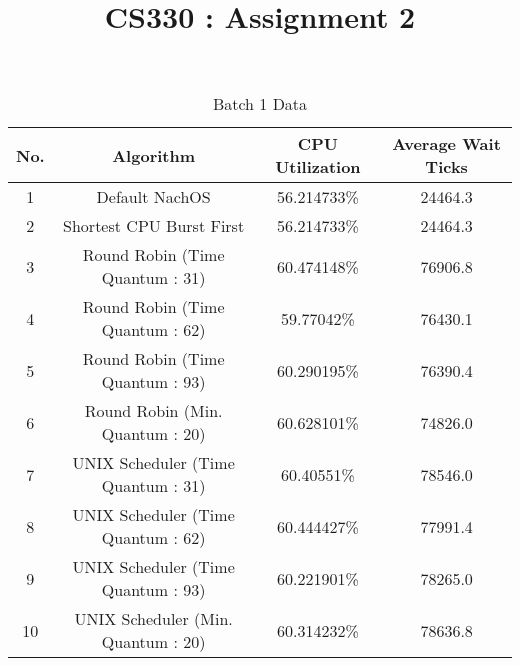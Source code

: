 \documentclass{article}
\author{}
\title{CS330 : Assignment 2}
\begin{document}
\maketitle
\section*{}
	\def\arraystretch{1.5}
	\begin{table}[!htb]
		
			\caption{Batch 1 Data}
		\begin{tabular}{ |c|c|c|c| }
			\hline
			\textbf{No.} & \textbf{Algorithm} & \textbf{CPU Utilization} & \textbf{Average Wait Ticks} \\ \hline
			1     &       Default NachOS  &                               56.214733\%			&       24464.3  \\      \hline
			2       &       Shortest        CPU     Burst   First   &               56.214733\%     &       24464.3  \\      \hline 
			3       &       Round   Robin   (Time   Quantum :       31)&    60.474148\%     &       76906.8  \\      \hline
			4       &       Round   Robin   (Time   Quantum :       62)&    59.77042\%      &       76430.1  \\      \hline
			5       &       Round   Robin   (Time   Quantum :       93)&    60.290195\%     &       76390.4  \\      \hline
			6       &       Round   Robin   (Min.   Quantum :       20)&    60.628101\%     &       74826.0  \\      \hline
			7       &       UNIX    Scheduler       (Time   Quantum :       31)&    60.40551\%      &       78546.0  \\      \hline 
			8       &       UNIX    Scheduler       (Time   Quantum :       62)&    60.444427\%     &       77991.4  \\      \hline 
			9       &       UNIX    Scheduler       (Time   Quantum :       93)&    60.221901\%     &       78265.0  \\      \hline 
			10      &       UNIX    Scheduler       (Min.   Quantum :       20)&    60.314232\%     &       78636.8  \\      \hline 
			
		\end{tabular}
	
	\end{table}
\end{document}

